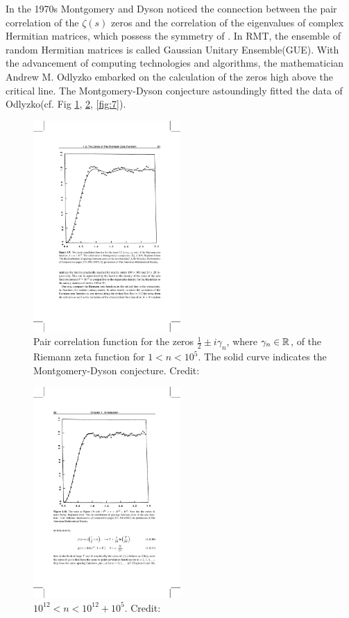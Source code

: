 In the 1970s Montgomery and Dyson noticed the connection between the pair correlation of the $\zeta \left({s}\right)$ zeros and the correlation of the eigenvalues of complex Hermitian matrices, which possess the symmetry of .\cite{mont} In RMT, the ensemble of random Hermitian matrices is called Gaussian Unitary Ensemble(GUE). With the advancement of computing technologies and algorithms, the mathematician Andrew M. Odlyzko embarked on the calculation of the zeros high above the critical line.\cites{od87}{od01} The Montgomery-Dyson conjecture astoundingly fitted the data of Odlyzko(cf. Fig \ref{fig:5}, \ref{fig:6}, \ref{fig:7}).
\begin{figure}[H]
\includegraphics[width=0.5\textwidth]{5}
\centering
\caption{Pair correlation function for the zeros $\frac{1}{2}\pm i\gamma_n$, where $\gamma_n\in\mathbb{R}$, of the Riemann zeta function for $1<n<10^5$. The solid curve indicates the Montgomery-Dyson conjecture. Credit:\cite{od87}}
\label{fig:5}
\end{figure}
\begin{figure}[H]
\includegraphics[width=0.5\textwidth]{6}
\centering
\caption{$10^12<n<10^12+10^5$. Credit:\cite{od87}}
\label{fig:6}
\end{figure}
